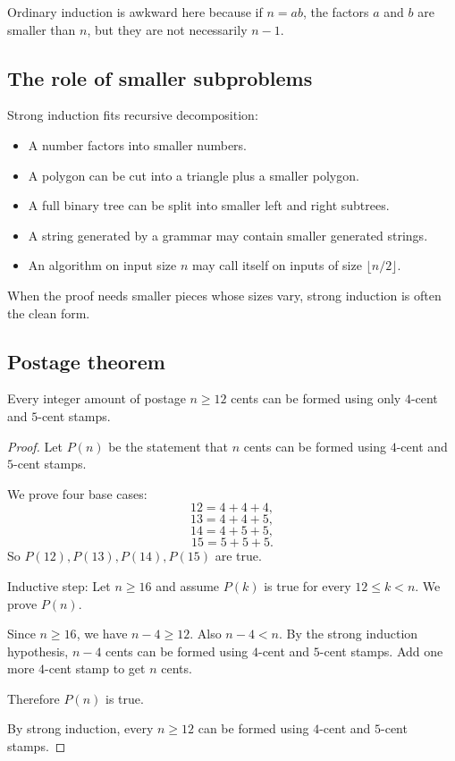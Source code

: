Ordinary induction is awkward here because if $n=ab$, the factors $a$ and $b$ are smaller than $n$, but they are not necessarily $n-1$.

\subsection{The role of smaller subproblems}

Strong induction fits recursive decomposition:

\begin{itemize}
\item A number factors into smaller numbers.
\item A polygon can be cut into a triangle plus a smaller polygon.
\item A full binary tree can be split into smaller left and right subtrees.
\item A string generated by a grammar may contain smaller generated strings.
\item An algorithm on input size $n$ may call itself on inputs of size $\lfloor n/2\rfloor$.
\end{itemize}

When the proof needs smaller pieces whose sizes vary, strong induction is often the clean form.

\subsection{Postage theorem}

\begin{theorem}
Every integer amount of postage $n\geq12$ cents can be formed using only $4$-cent and $5$-cent stamps.
\end{theorem}

\begin{proof}
Let $P(n)$ be the statement that $n$ cents can be formed using $4$-cent and $5$-cent stamps.

We prove four base cases:
\[
12=4+4+4,
\]
\[
13=4+4+5,
\]
\[
14=4+5+5,
\]
\[
15=5+5+5.
\]
So $P(12),P(13),P(14),P(15)$ are true.

Inductive step: Let $n\geq16$ and assume $P(k)$ is true for every $12\leq k<n$. We prove $P(n)$.

Since $n\geq16$, we have $n-4\geq12$. Also $n-4<n$. By the strong induction hypothesis, $n-4$ cents can be formed using $4$-cent and $5$-cent stamps. Add one more $4$-cent stamp to get $n$ cents.

Therefore $P(n)$ is true.

By strong induction, every $n\geq12$ can be formed using $4$-cent and $5$-cent stamps.
\end{proof}

